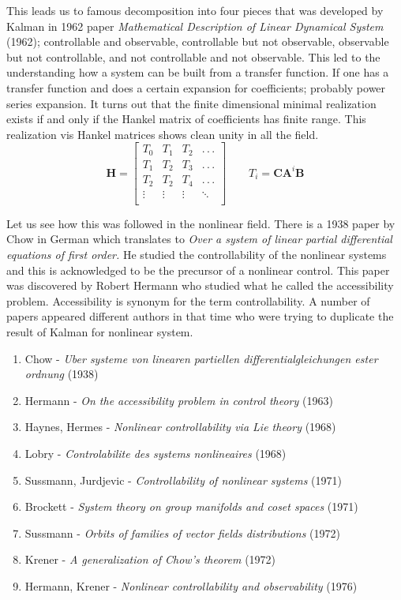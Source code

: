 \documentclass{article}
\begin{document}
This leads us to famous decomposition into four pieces that was developed by Kalman in 1962 paper \textit{Mathematical Description of Linear Dynamical System} (1962); controllable and observable, controllable but not observable, observable but not controllable, and not controllable and not observable. This led to the understanding how a system can be built from a transfer function. If one has a transfer function and does a certain expansion for coefficients; probably power series expansion. It turns out that the finite dimensional minimal realization exists if and only if the Hankel matrix of coefficients has finite range. This realization vis Hankel matrices shows clean unity in all the field.
$$
\bm{H}=
\begin{bmatrix}
    T_{0}&T_{1}&T_{2}&.\,.\,.\\
    T_{1}&T_{2}&T_{3}&.\,.\,.\\
    T_{2}&T_{2}&T_{4}&.\,.\,.\\
    \vdots&\vdots&\vdots&\ddots\\
\end{bmatrix}
\quad\quad T_{i}=\bm{C}\bm{A}^{i}\bm{B}
$$

Let us see how this was followed in the nonlinear field. There is a 1938 paper by Chow in German which translates to \textit{Over a system of linear partial differential equations of first order.} He studied the controllability of the nonlinear systems and this is acknowledged to be the precursor of a nonlinear control. This paper was discovered by Robert Hermann who studied what he called the accessibility problem. Accessibility is synonym for the term controllability. A number of papers appeared different authors in that time who were trying to duplicate the result of Kalman for nonlinear system.

\begin{enumerate}
    \item Chow - \textit{Uber systeme von linearen partiellen differentialgleichungen ester ordnung} (1938)
    \item Hermann - \textit{On the accessibility problem in control theory} (1963)
    \item Haynes, Hermes - \textit{Nonlinear controllability via Lie theory} (1968)
    \item Lobry - \textit{Controlabilite des systems nonlineaires} (1968)
    \item Sussmann, Jurdjevic - \textit{Controllability of nonlinear systems} (1971)
    \item Brockett - \textit{System theory on group manifolds and coset spaces} (1971)
    \item Sussmann - \textit{Orbits of families of vector fields distributions} (1972)
    \item Krener - \textit{A generalization of Chow's theorem} (1972)
    \item Hermann, Krener - \textit{Nonlinear controllability and observability} (1976)
\end{enumerate}
\end{document}

